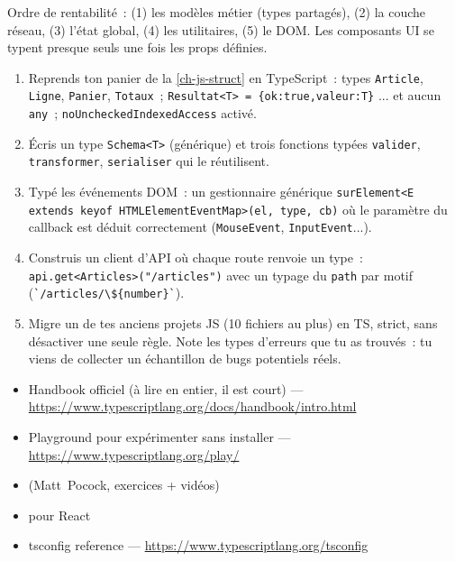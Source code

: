 Ordre de rentabilit\'e~: (1) les mod\`eles m\'etier (types partag\'es), (2) la couche r\'eseau,
(3) l'\'etat global, (4) les utilitaires, (5) le DOM. Les composants UI se typent presque seuls
une fois les props d\'efinies.

\begin{exercice}
\begin{enumerate}
  \item Reprends ton panier de la \cref{ch-js-struct} en TypeScript~: types \verb|Article|,
        \verb|Ligne|, \verb|Panier|, \verb|Totaux|~; \verb|Resultat<T> = {ok:true,valeur:T}| ...
        et aucun \verb|any|~; \verb|noUncheckedIndexedAccess| activ\'e.
  \item \'Ecris un type \verb|Schema<T>| (g\'en\'erique) et trois fonctions typ\'ees
        \verb|valider|, \verb|transformer|, \verb|serialiser| qui le r\'eutilisent.
  \item Typ\'e les \'ev\'enements DOM~: un gestionnaire g\'en\'erique
        \verb|surElement<E extends keyof HTMLElementEventMap>(el, type, cb)| o\`u le param\`etre du
        callback est d\'eduit correctement (\verb|MouseEvent|, \verb|InputEvent|...).
  \item Construis un client d'API o\`u chaque route renvoie un type~: \verb|api.get<Articles>("/articles")|
        avec un typage du \verb|path| par motif (\verb|`/articles/\${number}`|).
  \item Migre un de tes anciens projets JS (10 fichiers au plus) en TS, strict, sans
        d\'esactiver une seule r\`egle. Note les types d'erreurs que tu as trouv\'es~: tu viens de
        collecter un \'echantillon de bugs potentiels r\'eels.
\end{enumerate}
\end{exercice}

\begin{ressources}
\begin{itemize}
  \item Handbook officiel (\`a lire en entier, il est court) --- \url{https://www.typescriptlang.org/docs/handbook/intro.html}
  \item Playground pour exp\'erimenter sans installer --- \url{https://www.typescriptlang.org/play/}
  \item {} (Matt~Pocock, exercices + vid\'eos)
  \item {} pour React
  \item tsconfig reference --- \url{https://www.typescriptlang.org/tsconfig}
\end{itemize}
\end{ressources}

